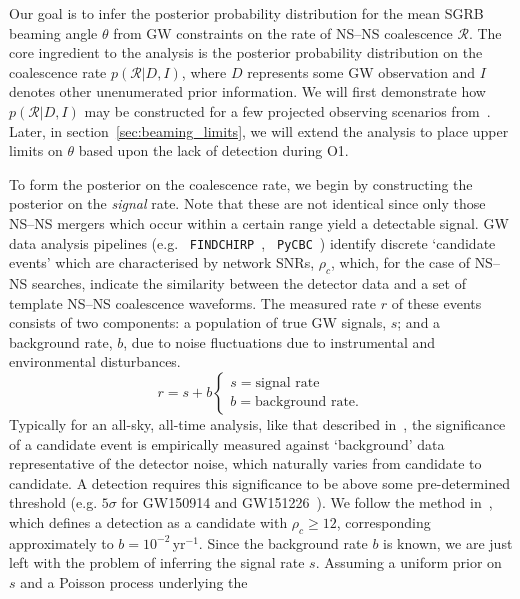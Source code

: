 \documentclass[twocolumn,nofootinbib]{revtex4-1}
\newcommand{\cbcrate}{{{\mathcal R}}}
\newcommand{\BNS}{\ac{NS}--\ac{NS}\xspace}
\begin{document}
Our goal is to infer the posterior probability distribution for the mean
\ac{SGRB} beaming angle $\theta$ from \ac{GW} constraints on the rate of \BNS
coalescence $\cbcrate$.  The core ingredient to the analysis is the posterior
probability distribution on the coalescence rate $p(\cbcrate|D,I)$, where $D$
represents some \ac{GW} observation and $I$ denotes other unenumerated prior
information.  We will first demonstrate how $p(\cbcrate|D,I)$ may be constructed
for a few projected observing scenarios from~\cite{Aasi:2013wya}.  Later, in
section~\ref{sec:beaming_limits}, we will extend the analysis to place upper
limits on $\theta$ based upon the lack of detection during O1.

To form the posterior on the coalescence rate, we begin by constructing the
posterior on the \emph{signal} rate.  Note that these are not identical since
only those \BNS mergers which occur within a certain range yield a detectable
signal.  \ac{GW} data analysis pipelines (e.g. {\tt
FINDCHIRP}~\cite{2012PhRvD..85l2006A}, {\tt
PyCBC}~\cite{Canton:2014ena,Usman:2015kfa,alex_nitz_2017_844934}) identify
discrete `candidate events' which are characterised by network \acp{SNR},
$\rho_c$, which, for the case of \BNS searches, indicate the similarity between
the detector data and a set of template \BNS coalescence waveforms.  The
measured rate $r$ of these events consists of two components: a population of
true \ac{GW} signals, $s$; and a background rate, $b$, due to noise fluctuations
due to instrumental and environmental disturbances.
%
\begin{equation}
r = s + b
\begin{cases}
s = \text{signal rate} \\
b = \text{background rate}.
\end{cases}
\end{equation}
%
Typically for an all-sky, all-time analysis, like that described
in~\cite{Usman:2015kfa}, the significance of a candidate event is
empirically measured against `background' data representative of the
detector noise, which naturally varies from candidate to candidate.  A
detection requires this significance to be above some pre-determined
threshold (e.g. $5\sigma$ for GW150914 and
GW151226~\cite{Abbott:2016blz,Abbott:2016nmj}).  We follow the method
in~\cite{Aasi:2013wya}, which defines a detection as a candidate with
$\rho_c \geq 12$, corresponding approximately to
$b=10^{-2}$\,yr$^{-1}$.  Since the background rate $b$ is known, we
are just left with the problem of inferring the signal rate $s$.
Assuming a uniform prior on $s$ and a Poisson process underlying the
\end{document}
